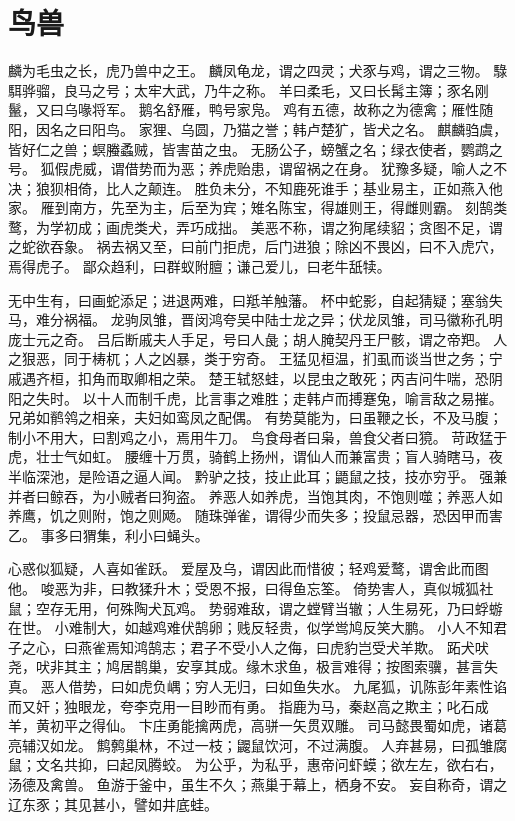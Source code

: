 \documentclass[12pt,UTF8]{ctexbook}
\begin{document}
\chapter{鸟兽}

麟为毛虫之长，虎乃兽中之王。
麟凤龟龙，谓之四灵；犬豕与鸡，谓之三物。
騄駬骅骝，良马之号；太牢大武，乃牛之称。
羊曰柔毛，又曰长髯主簿；豕名刚鬣，又曰乌喙将军。
鹅名舒雁，鸭号家凫。
鸡有五德，故称之为德禽；雁性随阳，因名之曰阳鸟。
家狸、乌圆，乃猫之誉；韩卢楚犷，皆犬之名。
麒麟驺虞，皆好仁之兽；螟螣蟊贼，皆害苗之虫。
无肠公子，螃蟹之名；绿衣使者，鹦鹉之号。
狐假虎威，谓借势而为恶；养虎贻患，谓留祸之在身。
犹豫多疑，喻人之不决；狼狈相倚，比人之颠连。
胜负未分，不知鹿死谁手；基业易主，正如燕入他家。
雁到南方，先至为主，后至为宾；雉名陈宝，得雄则王，得雌则霸。
刻鹄类鹜，为学初成；画虎类犬，弄巧成拙。
美恶不称，谓之狗尾续貂；贪图不足，谓之蛇欲吞象。
祸去祸又至，曰前门拒虎，后门进狼；除凶不畏凶，曰不入虎穴，焉得虎子。
鄙众趋利，曰群蚁附膻；谦己爱儿，曰老牛舐犊。

无中生有，曰画蛇添足；进退两难，曰羝羊触藩。
杯中蛇影，自起猜疑；塞翁失马，难分祸福。
龙驹凤雏，晋闵鸿夸吴中陆士龙之异；伏龙凤雏，司马徽称孔明庞士元之奇。
吕后断戚夫人手足，号曰人彘；胡人腌契丹王尸骸，谓之帝羓。
人之狠恶，同于梼杌；人之凶暴，类于穷奇。
王猛见桓温，扪虱而谈当世之务；宁戚遇齐桓，扣角而取卿相之荣。
楚王轼怒蛙，以昆虫之敢死；丙吉问牛喘，恐阴阳之失时。
以十人而制千虎，比言事之难胜；走韩卢而搏蹇兔，喻言敌之易摧。
兄弟如鹡鸰之相亲，夫妇如鸾凤之配偶。
有势莫能为，曰虽鞭之长，不及马腹；制小不用大，曰割鸡之小，焉用牛刀。
鸟食母者曰枭，兽食父者曰獍。
苛政猛于虎，壮士气如虹。
腰缠十万贯，骑鹤上扬州，谓仙人而兼富贵；盲人骑瞎马，夜半临深池，是险语之逼人闻。
黔驴之技，技止此耳；鼯鼠之技，技亦穷乎。
强兼并者曰鲸吞，为小贼者曰狗盗。
养恶人如养虎，当饱其肉，不饱则噬；养恶人如养鹰，饥之则附，饱之则飏。
随珠弹雀，谓得少而失多；投鼠忌器，恐因甲而害乙。
事多曰猬集，利小曰蝇头。

心惑似狐疑，人喜如雀跃。
爱屋及乌，谓因此而惜彼；轻鸡爱鹜，谓舍此而图他。
唆恶为非，曰教猱升木；受恩不报，曰得鱼忘筌。
倚势害人，真似城狐社鼠；空存无用，何殊陶犬瓦鸡。
势弱难敌，谓之螳臂当辙；人生易死，乃曰蜉蝣在世。
小难制大，如越鸡难伏鹄卵；贱反轻贵，似学鸴鸠反笑大鹏。
小人不知君子之心，曰燕雀焉知鸿鹄志；君子不受小人之侮，曰虎豹岂受犬羊欺。
跖犬吠尧，吠非其主；鸠居鹊巢，安享其成。缘木求鱼，极言难得；按图索骥，甚言失真。
恶人借势，曰如虎负嵎；穷人无归，曰如鱼失水。
九尾狐，讥陈彭年素性谄而又奸；独眼龙，夸李克用一目眇而有勇。
指鹿为马，秦赵高之欺主；叱石成羊，黄初平之得仙。
卞庄勇能擒两虎，高骈一矢贯双雕。
司马懿畏蜀如虎，诸葛亮辅汉如龙。
鹪鹩巢林，不过一枝；鼹鼠饮河，不过满腹。
人弃甚易，曰孤雏腐鼠；文名共抑，曰起凤腾蛟。
为公乎，为私乎，惠帝问虾蟆；欲左左，欲右右，汤德及禽兽。
鱼游于釜中，虽生不久；燕巢于幕上，栖身不安。
妄自称奇，谓之辽东豕；其见甚小，譬如井底蛙。
\end{document}
